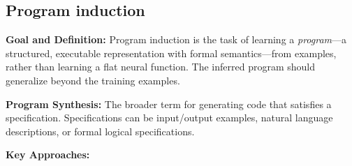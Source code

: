 \subsection{Program induction}

\textbf{Goal and Definition:}
Program induction is the task of learning a \emph{program}—a structured, executable representation with formal semantics—from examples, rather than learning a flat neural function. The inferred program should generalize beyond the training examples.

\textbf{Program Synthesis:} The broader term for generating code that satisfies a specification. Specifications can be input/output examples, natural language descriptions, or formal logical specifications.

\textbf{Key Approaches:}

